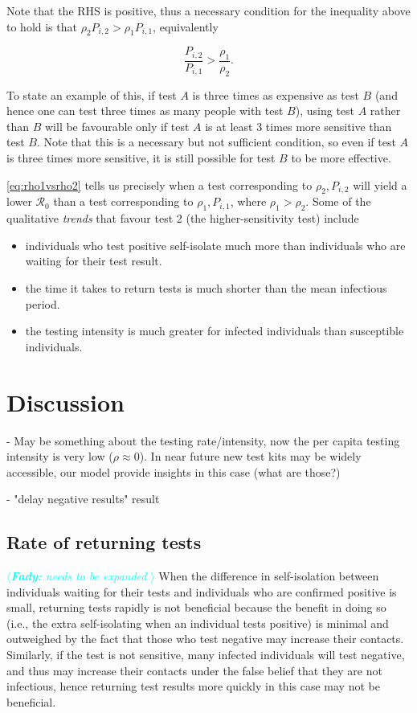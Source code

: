 \documentclass{article}
\newcommand{\fady}[1]{\textcolor{cyan}{$\langle${\slshape{\bfseries Fady:} #1 }$\rangle$}}
\newcommand{\Rnum}{\mathcal{R}_0}
\begin{document}
Note that the RHS is positive, thus a necessary condition for the inequality above to hold is that $\rho_2P_{i,2} > \rho_1P_{i,1}$, equivalently 

\begin{equation}
\frac{P_{i,2}}{P_{i,1}} > \frac{\rho_1}{\rho_2}.
\end{equation}

To state an example of this, if test $A$ is three times as expensive as test $B$ (and hence one can test three times as many people with test $B$), using test $A$ rather than $B$ will be favourable only if test $A$ is at least 3 times more sensitive than test $B$. Note that this is a necessary but not sufficient condition, so even if test $A$ is three times more sensitive, it is still possible for test $B$ to be more effective. 

\cref{eq:rho1vsrho2} tells us precisely when a test corresponding to $\rho_2, P_{i,2}$ will yield a lower $\Rnum$ than a test corresponding to $\rho_1, P_{i,1}$, where $\rho_1 > \rho_2$. Some of the qualitative \textit{trends} that favour test 2 (the higher-sensitivity test) include

\begin{itemize}
    \item individuals who test positive self-isolate much more than individuals who are waiting for their test result.
    \item the time it takes to return tests is much shorter than the mean infectious period.
    \item the testing intensity is much greater for infected individuals than susceptible individuals.
\end{itemize}

\section{Discussion}

- May be something about the testing rate/intensity, now the per capita testing intensity is very low ($\rho \approx 0$). In near future new test kits may be widely accessible, our model provide insights in this case (what are those?)

- "delay negative results" result

\subsection{Rate of returning tests}
\fady{needs to be expanded}
When the difference in self-isolation between individuals waiting for their tests and individuals who are confirmed positive is small, returning tests rapidly is not beneficial because the benefit in doing so (i.e., the extra self-isolating when an individual tests positive) is minimal and outweighed by the fact that those who test negative may increase their contacts. Similarly, if the test is not sensitive, many infected individuals will test negative, and thus may increase their contacts under the false belief that they are not infectious, hence returning test results more quickly in this case may not be beneficial. 
\end{document}
